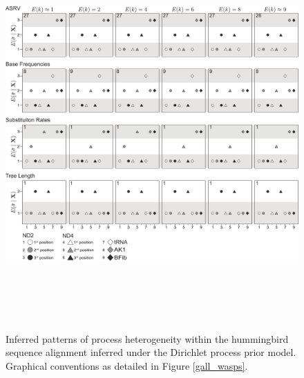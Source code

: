 \documentclass[11pt]{article}
\begin{document}
\begin{figure}[h] 
\centering 
\includegraphics[angle=90, height=150mm]{figure_4.pdf} 
\caption{Inferred patterns of process heterogeneity within the hummingbird sequence alignment inferred under the Dirichlet process prior model.  Graphical conventions as detailed in Figure \ref{gall_wasps}.}
\label{hummers}
\end{figure} 
\end{document}
